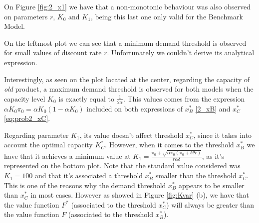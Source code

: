 On Figure \ref{fig:2_x1} we have that a non-monotonic behaviour was also observed on parameters $r$, $K_0$ and $K_1$, being this last one only valid for the Benchmark Model.

On the leftmost plot we can see that a minimum demand threshold is observed for small values of discount rate $r$. Unfortunately we couldn't derive its analytical expression.

Interestingly, as seen on the plot located at the center, regarding the capacity of \textit{old} product, a maximum demand threshold is observed for both models when the capacity level $K_0$ is exactly equal to $\frac{1}{2 \alpha}$. This values comes from the expression $\alpha K_0 \pi_0=\alpha K_0 (1-\alpha K_0)$ included on both expressions of $x_B^*$ \eqref{2_xB} and $x^*_C$ \eqref{eq:prob2_xC}.

Regarding parameter $K_1$, its value doesn't affect threshold $x^*_C$, since it takes into account the optimal capacity $K^*_C$. However, when it comes to the threshold $x^*_B$ we have that it achieves a minimum value at $K_1=\frac{\pi_0+\sqrt{\alpha \pi_0(\pi_0+\delta \theta r)}}{r\alpha \delta}$, as it's represented on the bottom plot. Note that the standard value considered was $K_1=100$ and that it's associated a threshold $x_B^*$ smaller than the threshold $x_C^*$. This is one of the reasons why the demand threshold $x_B^*$ appears to be smaller than $x_C^*$ in most cases. However as showed in Figure \ref{fig:Kvar} (b), we have that the value function $F^*$ (associated to the threshold $x_C^*$) will always be greater than the value function $F$ (associated to the threshold $x_B^*$).
	
